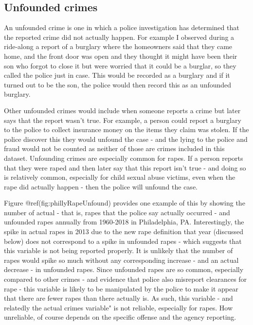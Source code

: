\documentclass[
  12pt,
  openany]{book}
\begin{document}
\hypertarget{unfounded-crimes}{%
\subsection{Unfounded crimes}\label{unfounded-crimes}}

An unfounded crime is one in which a police investigation has determined that the reported crime did not actually happen. For example I observed during a ride-along a report of a burglary where the homeowners said that they came home, and the front door was open and they thought it might have been their son who forgot to close it but were worried that it could be a burglar, so they called the police just in case. This would be recorded as a burglary and if it turned out to be the son, the police would then record this as an unfounded burglary.

Other unfounded crimes would include when someone reports a crime but later says that the report wasn't true. For example, a person could report a burglary to the police to collect insurance money on the items they claim was stolen. If the police discover this they would unfound the case - and the lying to the police and fraud would not be counted as neither of those are crimes included in this dataset. Unfounding crimes are especially common for rapes. If a person reports that they were raped and then later say that this report isn't true - and doing so is relatively common, especially for child sexual abuse victims, even when the rape did actually happen - then the police will unfound the case.

Figure @ref(fig:phillyRapeUnfound) provides one example of this by showing the number of actual - that is, rapes that the police say actually occurred - and unfounded rapes annually from 1960-2018 in Philadelphia, PA. Interestingly, the spike in actual rapes in 2013 due to the new rape definition that year (discussed below) does not correspond to a spike in unfounded rapes - which suggests that this variable is not being reported properly. It is unlikely that the number of rapes would spike so much without any corresponding increase - and an actual decrease - in unfounded rapes. Since unfounded rapes are so common, especially compared to other crimes - and evidence that police also misreport clearances for rape - this variable is likely to be manipulated by the police to make it appear that there are fewer rapes than there actually is. As such, this variable - and relatedly the actual crimes variable" is not reliable, especially for rapes. How unreliable, of course depends on the specific offense and the agency reporting.
\end{document}

